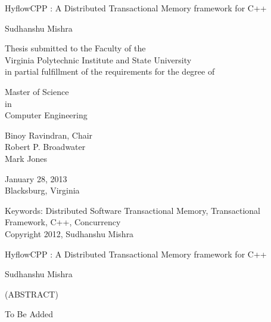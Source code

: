 \documentclass[12pt,english]{report}
\begin{document}
\thispagestyle{empty}
\begin{center}

{\Large 
HyflowCPP : A Distributed Transactional Memory framework for C++
}

\vfill

Sudhanshu Mishra

\vfill

Thesis submitted to the Faculty of the \\
Virginia Polytechnic Institute and State University \\
in partial fulfillment of the requirements for the degree of

\vfill

Master of Science \\
in \\
Computer Engineering


\vfill

Binoy Ravindran, Chair \\
Robert P. Broadwater \\
Mark Jones


\vfill

January 28, 2013 \\
Blacksburg, Virginia

\vfill

Keywords: Distributed Software Transactional Memory, Transactional Framework, C++, Concurrency
\\
Copyright 2012, Sudhanshu Mishra

\end{center}

\pagebreak

\thispagestyle{empty}
\begin{center}

{\large
HyflowCPP : A Distributed Transactional Memory framework for C++
}

\vfill

Sudhanshu Mishra

\vfill

(ABSTRACT)

\vfill

\end{center}

To Be Added




\vfill


\end{document}
